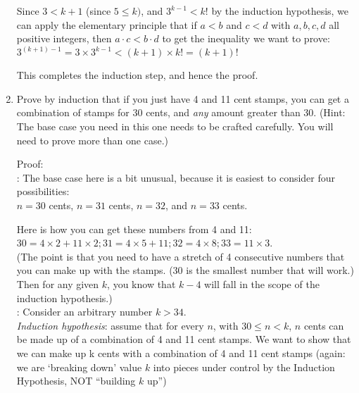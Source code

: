 \documentclass[12pt]{article}
\begin{document}
\begin{enumerate}
Since $3 < k+1$ (since $5\leq k)$, and $3^{k-1} < k!$ by the induction hypothesis, we can apply the
elementary principle that if $a < b$ and $c < d$ with $a, b, c, d$ all positive integers,
then $a\cdot c < b\cdot d$ to get the inequality
we want to prove:\\

$3^{(k+1) -1} = 3\times3^{k-1} < (k+1)\times k! = (k+1)!$

This completes the induction step, and hence the proof.




\newpage
\item Prove by induction that if you just have 4 and 11 cent stamps, you can get a combination of stamps for 30 cents, and {\it{any}} amount greater than 30. (Hint: The base case you need in this one needs to be crafted carefully. You will need to prove more than one case.)


Proof:\\

: The base case here is a bit unusual, because it is easiest to consider four possibilities:\\
$n = 30$ cents, $n = 31$ cents, $n = 32$, and $n = 33$ cents. 

Here is how you can get these numbers from 4 and 11: $30 = 4\times2 + 11 \times 2; 31 = 4\times 5 + 11; 32 = 4\times 8; 33 = 11 \times 3$.\\

(The point is that you need to have a stretch of 4 consecutive numbers that you can make up with the stamps. (30 is the smallest number that will work.) Then for any given $k$, you know that $k-4$ will fall in the scope of the induction hypothesis.)\\



: Consider an arbitrary number $k > 34$.\\
{\it{Induction hypothesis}}: assume that for
every $n$, with $30 \leq n < k$, $n$ cents can be made up of a combination of 4 and 11 cent stamps. We want to show that we can make up k cents with a combination of 4 and 11 cent stamps (again: we are `breaking down' value $k$ into pieces under control by the Induction Hypothesis, NOT ``building $k$ up'')\\


\end{enumerate}
\end{document}

